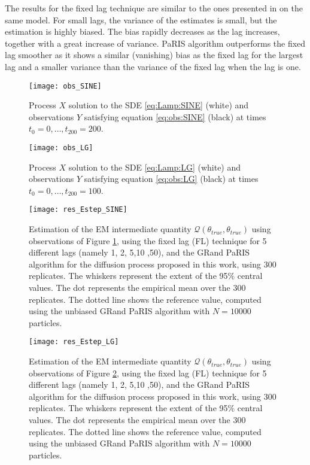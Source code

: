 \documentclass[12pt,draft]{article}
\newcommand{\1}{\mathrm{1}}
\begin{document}
The results for the fixed lag technique are similar to the ones presented in \cite[Figure 1]{olsson:strojby:2011} on the same model. For small lags, the variance of the estimates is small, but the estimation is highly biased. The bias rapidly decreases as the lag increases, together with a  great increase of variance.  PaRIS algorithm outperforms the fixed lag smoother as it shows  a similar (vanishing) bias as the fixed lag for the largest lag and a smaller variance than the variance of the fixed lag when the lag is one. 
\begin{figure}[p]
\centering
\texttt{[image: obs\_SINE]}
\caption{Process $X$ solution to the SDE \eqref{eq:Lamp:SINE} (white) and observations $Y$ satisfying equation \eqref{eq:obs:SINE} (black) at times $t_0=0,\dots,t_{200}=200$.}
\label{fig:obs:SINE}
\end{figure}
\begin{figure}[p]
\centering
\texttt{[image: obs\_LG]}
\caption{Process $X$ solution to the SDE \eqref{eq:Lamp:LG} (white) and observations $Y$ satisfying equation \eqref{eq:obs:LG}  (black) at times $t_0=0,\dots,t_{200}=100$.}
\label{fig:obs:LG}
\end{figure}
\begin{figure}[p]
\centering
\texttt{[image: res\_Estep\_SINE]}
\caption{Estimation of the EM intermediate quantity $\mathcal{Q}(\theta_{true},\theta_{true})$ using observations of Figure \ref{fig:obs:SINE}, using the fixed lag (FL) technique for 5 different lags (namely 1, 2, 5,10 ,50), and the GRand PaRIS algorithm for the diffusion process proposed in this work, using 300 replicates. The whiskers represent the extent of the 95\% central values. The dot represents the empirical mean over the 300 replicates. The dotted line shows the reference value, computed using the unbiased GRand PaRIS algorithm with $N=10000$ particles.}
\label{fig:res:SINE}
\end{figure}
\begin{figure}[p]
\centering
\texttt{[image: res\_Estep\_LG]}
\caption{Estimation of the EM intermediate quantity $\mathcal{Q}(\theta_{true},\theta_{true})$ using observations of Figure \ref{fig:obs:LG}, using the fixed lag (FL) technique for 5 different lags (namely 1, 2, 5,10 ,50), and the GRand PaRIS algorithm for the diffusion process proposed in this work, using 300 replicates. The whiskers represent the extent of the 95\% central values. The dot represents the empirical mean over the 300 replicates. The dotted line shows the reference value, computed using the unbiased GRand PaRIS algorithm with $N=10000$ particles.}
\label{fig:res:LG}
\end{figure}
\end{document}
